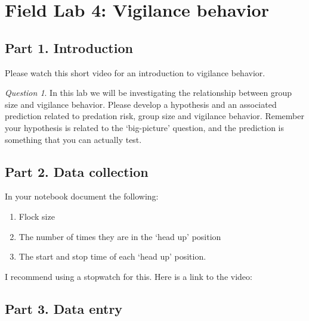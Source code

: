 \documentclass[]{book}
\providecommand{\tightlist}{%
  \setlength{\itemsep}{0pt}\setlength{\parskip}{0pt}}
\begin{document}
\hypertarget{field-lab-4-vigilance-behavior}{%
\chapter*{Field Lab 4: Vigilance behavior}\label{field-lab-4-vigilance-behavior}}

\hypertarget{part-1.-introduction-1}{%
\section*{Part 1. Introduction}\label{part-1.-introduction-1}}

Please watch this short video for an introduction to vigilance behavior.

\emph{Question 1}. In this lab we will be investigating the relationship between group size and vigilance behavior. Please develop a hypothesis and an associated prediction related to predation risk, group size and vigilance behavior. Remember your hypothesis is related to the `big-picture' question, and the prediction is something that you can actually test.

\hypertarget{part-2.-data-collection}{%
\section*{Part 2. Data collection}\label{part-2.-data-collection}}

In your notebook document the following:

\begin{enumerate}
\def\labelenumi{\arabic{enumi}.}
\tightlist
\item
  Flock size\\
\item
  The number of times they are in the `head up' position\\
\item
  The start and stop time of each `head up' position.
\end{enumerate}

I recommend using a stopwatch for this. Here is a link to the video:

\hypertarget{part-3.-data-entry}{%
\section*{Part 3. Data entry}\label{part-3.-data-entry}}
\end{document}
